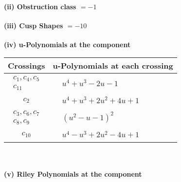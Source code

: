 \documentclass[1p]{elsarticle_modified}
\theoremstyle{definition}
\begin{document}
\flushleft \textbf{(ii) Obstruction class $= -1$}\\~\\
\flushleft \textbf{(iii) Cusp Shapes $= -10$}\\~\\
\newpage\renewcommand{\arraystretch}{1}
\flushleft \textbf{(iv) u-Polynomials at the component}\newline \\
\begin{tabular}{m{50pt}|m{274pt}}
Crossings & \hspace{64pt}u-Polynomials at each crossing \\
\hline $$\begin{aligned}c_{1},c_{4},c_{5}\\c_{11}\end{aligned}$$&$\begin{aligned}
&u^4+u^3-2 u-1
\end{aligned}$\\
\hline $$\begin{aligned}c_{2}\end{aligned}$$&$\begin{aligned}
&u^4+u^3+2 u^2+4 u+1
\end{aligned}$\\
\hline $$\begin{aligned}c_{3},c_{6},c_{7}\\c_{8},c_{9}\end{aligned}$$&$\begin{aligned}
&(u^2- u-1)^2
\end{aligned}$\\
\hline $$\begin{aligned}c_{10}\end{aligned}$$&$\begin{aligned}
&u^4- u^3+2 u^2-4 u+1
\end{aligned}$\\
\hline
\end{tabular}\\~\\
\newpage\renewcommand{\arraystretch}{1}
\flushleft \textbf{(v) Riley Polynomials at the component}\newline \\
\end{document}
